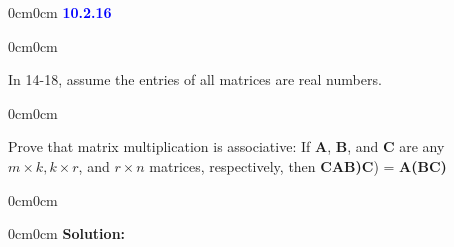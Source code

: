 \documentclass{article}
\newcommand{\header}[1]{
	\vspace{0.25cm}
		\begin{adjustwidth}{0cm}{0cm}
			\textcolor{blue}{\textbf{#1}}
		\end{adjustwidth}
	\vspace{0.25cm}
}
\newcommand{\container}[1]{
	\vspace{0.25cm}
		\begin{adjustwidth}{0cm}{0cm}
			#1
		\end{adjustwidth}
	\vspace{0.25cm}
}
\newcommand{\solution}[2]{
	\vspace{0.25cm}
		\begin{adjustwidth}{0cm}{0cm}
			\textbf{Solution: #1} #2
		\end{adjustwidth}
	\vspace{0.25cm}
}
\newcommand{\wrapper}[1]{
	\vspace{0.25cm}
		\begin{adjustwidth}{0cm}{0cm}
			#1
		\end{adjustwidth}
	\vspace{0cm}
}
\begin{document}
	\header{10.2.16}

	\container{
		In 14-18, assume the entries of all matrices are
		real numbers.
		
		\wrapper{
			Prove that matrix multiplication is associative:
			If \textbf{A}, \textbf{B}, and \textbf{C} are any
			\(m \times k, k \times r\), and \(r \times n\)
			matrices, respectively, then \textbf{CAB)C}) =
			\textbf{A(BC)}
		}
	}

	\container{}

	\solution{}{}
	
\end{document}
